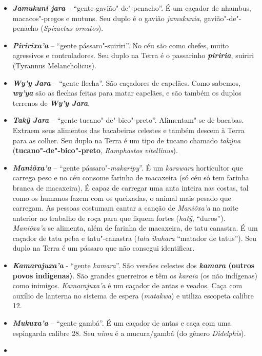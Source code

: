 \begin{itemize}
\item
  \textbf{\emph{Jamukuni jara}} -- ``gente gavião"-de"-penacho''. É um
  caçador de nhambus, macacos"-pregos e mutuns. Seu duplo é o gavião
  \emph{jamukunia}, gavião"-de"-penacho (\emph{Spizaetus ornatos}).
\item
  \emph{\textbf{Piririxa'a}} -- ``gente pássaro"-suiriri''. No céu são
  como chefes, muito agressivos e controladores. Seu duplo na Terra é o
  passarinho \emph{\textbf{piriria}}, suiriri (Tyrannus Melancholicus).
\item
  \emph{\textbf{Wy'y Jara}} -- ``gente flecha''. São caçadores de
  capelães. Como sabemos, \emph{\textbf{wy'ya}} são as flechas feitas
  para matar capelães, e são também os duplos terrenos de
  \emph{\textbf{Wy'y Jara}}.
\item
  \emph{\textbf{Takỹ Jara}} -- ``gente tucano"-de"-bico"-preto''.
  Alimentam"-se de bacabas. Extraem seus alimentos das bacabeiras
  celestes e também descem à Terra para as colher. Seu duplo na Terra é
  um tipo de tucano chamado \emph{takỹna}
  (\textbf{tucano"-de"-bico"-preto}, \emph{Ramphastos} \emph{vitellinus}).
\item
  \textbf{\emph{Maniõxa'a}} -- ``gente pássaro"-\emph{makaripy}''. É um
  \emph{karawara} horticultor que carrega peso e no céu consome farinha
  de macaxeira (só céu só tem farinha branca de macaxeira). É capaz de
  carregar uma anta inteira nas costas, tal como os humanos fazem com os
  queixadas, o animal mais pesado que carregam. As pessoas costumam
  cantar a canção de \emph{Maniõxa'a} na noite anterior ao trabalho de
  roça para que fiquem fortes (\emph{hatỹ}, ``duros''). \emph{Maniõxa'a}
  se alimenta, além de farinha de macaxeira, de tatu canastra. É um
  caçador de tatu peba e tatu"-canastra (\emph{tatu ikahara} ``matador de
  tatus''). Seu duplo na Terra é um pássaro que não consegui
  identificar.
\item
  \textbf{\emph{Kamarajuxa'a}} - ``gente \emph{kamara}''. São versões
  celestes dos \textbf{\emph{kamara} (outros povos indígenas)}. São
  grandes guerreiros e têm os \emph{karaia} (os não indígenas) como
  inimigos. \emph{Kamarajuxa'a} é um caçador de antas e veados. Caça com
  auxílio de lanterna no sistema de espera (\emph{matakwa}) e utiliza
  escopeta calibre 12.
\item
  \emph{\textbf{Mukuxa'a}} -- ``gente gambá''. É um caçador de antas e
  caça com uma espingarda calibre 28. Seu \emph{nima} é a mucura/gambá
  (do gênero \emph{Didelphis}).
\item

\end{itemize}
